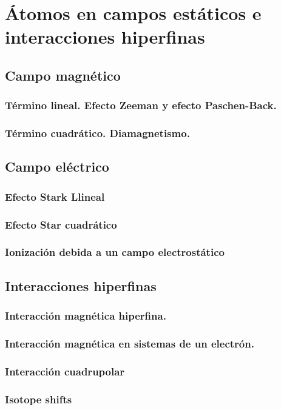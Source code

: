 \chapter{Átomos en campos estáticos e interacciones hiperfinas} \label{Ch:02}

\section{Campo magnético}

\subsection{Término lineal. Efecto Zeeman y efecto Paschen-Back.}

\subsection{Término cuadrático. Diamagnetismo.}

\section{Campo eléctrico}

\subsection{Efecto Stark Llineal}

\subsection{Efecto Star cuadrático}

\subsection{Ionización debida a un campo electrostático}

\section{Interacciones hiperfinas}

\subsection{Interacción magnética hiperfina.}

\subsection{Interacción magnética en sistemas de un electrón.}

\subsection{Interacción cuadrupolar}

\subsection{Isotope shifts}



